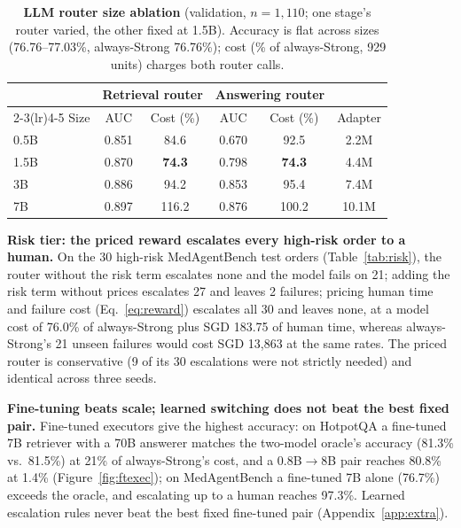 \documentclass{article}
\begin{document}
\begin{table}[!htb]
\caption{\textbf{LLM router size ablation} (validation, $n{=}1{,}110$; one stage's router varied, the other fixed at 1.5B). Accuracy is flat across sizes (76.76--77.03\%, always-Strong 76.76\%); cost (\% of always-Strong, 929 units) charges both router calls.}
\label{tab:routersize}
\centering\small
\begin{tabular}{@{}lccccc@{}}
\toprule
& \multicolumn{2}{c}{Retrieval router} & \multicolumn{2}{c}{Answering router} & \\
\cmidrule(lr){2-3}\cmidrule(lr){4-5}
Size & AUC & Cost (\%) & AUC & Cost (\%) & Adapter\\
\midrule
0.5B & 0.851 & 84.6 & 0.670 & 92.5 & 2.2M\\
1.5B & 0.870 & \textbf{74.3} & 0.798 & \textbf{74.3} & 4.4M\\
3B & 0.886 & 94.2 & 0.853 & 95.4 & 7.4M\\
7B & 0.897 & 116.2 & 0.876 & 100.2 & 10.1M\\
\bottomrule
\end{tabular}
\end{table}

\textbf{Risk tier: the priced reward escalates every high-risk order to a human.} On the 30 high-risk MedAgentBench test orders (Table~\ref{tab:risk}), the router without the risk term escalates none and the model fails on 21; adding the risk term without prices escalates 27 and leaves 2 failures; pricing human time and failure cost (Eq.~\ref{eq:reward}) escalates all 30 and leaves none, at a model cost of 76.0\% of always-Strong plus SGD 183.75 of human time, whereas always-Strong's 21 unseen failures would cost SGD 13,863 at the same rates. The priced router is conservative (9 of its 30 escalations were not strictly needed) and identical across three seeds.

\textbf{Fine-tuning beats scale; learned switching does not beat the best fixed pair.} Fine-tuned executors give the highest accuracy: on HotpotQA a fine-tuned 7B retriever with a 70B answerer matches the two-model oracle's accuracy (81.3\% vs.\ 81.5\%) at 21\% of always-Strong's cost, and a 0.8B$\to$8B pair reaches 80.8\% at 1.4\% (Figure~\ref{fig:ftexec}); on MedAgentBench a fine-tuned 7B alone (76.7\%) exceeds the oracle, and escalating up to a human reaches 97.3\%. Learned escalation rules never beat the best fixed fine-tuned pair (Appendix~\ref{app:extra}).
\end{document}
